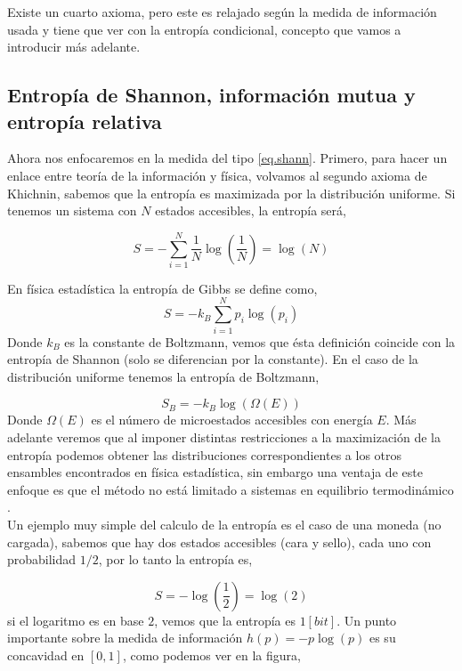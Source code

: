 \documentclass[executivepaper,12pt]{article}
\numberwithin{equation}{section}
\begin{document}
Existe un cuarto axioma, pero este es relajado según la medida de información usada y tiene que ver con la entropía condicional, concepto que vamos a introducir más adelante. 

\subsection{Entropía de Shannon, información mutua y entropía relativa}

Ahora nos enfocaremos en la medida del tipo \ref{eq.shann}. Primero, para hacer un enlace entre teoría de la información y física, volvamos al segundo axioma de Khichnin, sabemos que la entropía es maximizada por la distribución uniforme. Si tenemos un sistema con $N$ estados accesibles, la entropía será,

\begin{equation*}
	S=-\sum_{i=1}^N \frac{1}{N} \log(\frac{1}{N})=\log(N)
\end{equation*} 

En física estadística la entropía de Gibbs se define como,
\begin{equation*}
	S=-k_B\sum_{i=1}^N p_i \log(p_i)
\end{equation*}
Donde $k_B$ es la constante de Boltzmann, vemos que ésta definición coincide con la entropía de Shannon (solo se diferencian por la constante). En el caso de la distribución uniforme tenemos la entropía de Boltzmann,

\begin{equation*}
	S_B=-k_B \log(\Omega(E))
\end{equation*} 
Donde $\Omega(E)$ es el número de microestados accesibles con energía $E$. Más adelante veremos que al imponer distintas restricciones a la maximización de la entropía podemos obtener las distribuciones correspondientes a los otros ensambles encontrados en física estadística, sin embargo una ventaja de este enfoque es que el método no está limitado a sistemas en equilibrio termodinámico \parencite{beck2009,edwards1969}.\\

Un ejemplo muy simple del calculo de la entropía es el caso de una moneda (no cargada), sabemos que hay dos estados accesibles (cara y sello), cada uno con probabilidad $1/2$, por lo tanto la entropía es,

\begin{equation*}
	S=-\log(\frac{1}{2})=\log(2)
\end{equation*}
si el logaritmo es en base $2$, vemos que la entropía es $1 [bit]$. Un punto importante sobre la medida de información $h(p)=-p\log(p)$ es su concavidad en $[0,1]$, como podemos ver en la figura,
\end{document}
